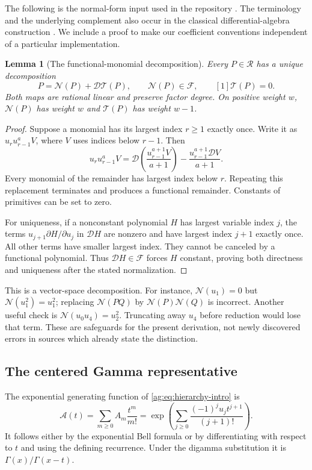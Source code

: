\documentclass[11pt,letterpaper]{article}
\numberwithin{equation}{section}
\newtheorem{lemma}[theorem]{Lemma}
\theoremstyle{definition}\newtheorem{definition}[theorem]{Definition}
\theoremstyle{remark}\newtheorem{remark}[theorem]{Remark}
\newcommand{\D}{\mathcal D}\newcommand{\NF}{\mathcal N}\newcommand{\Prim}{\mathcal T}
\newcommand{\A}{\mathcal A}\newcommand{\HH}{\mathcal H}\newcommand{\BB}{\mathcal B}
\begin{document}
The following is the normal-form input used in the repository
\cite{Manuscript,HTG}. The terminology and the underlying complement
also occur in the classical differential-algebra construction
\cite[Section~4.4.1]{GRR}. We include a proof to make our coefficient
conventions independent of a particular implementation.

\begin{lemma}[The functional-monomial decomposition]\label{ag:lem:normal}
Every $P\in\mathscr R$ has a unique decomposition
\begin{equation}\label{ag:eq:normal-decomp}
 P=\NF(P)+\D\Prim(P),\qquad \NF(P)\in\mathscr F,
                  \qquad [1]\Prim(P)=0.
\end{equation}
Both maps are rational linear and preserve factor degree. On positive
weight $w$, $\NF(P)$ has weight $w$ and $\Prim(P)$ has weight $w-1$.
\end{lemma}
\begin{proof}
Suppose a monomial has its largest index $r\ge1$ exactly once. Write it
as $u_r u_{r-1}^aV$, where $V$ uses indices below $r-1$. Then
\begin{equation}\label{ag:eq:ibp-step}
 u_r u_{r-1}^aV
 =\D\left(\frac{u_{r-1}^{a+1}V}{a+1}\right)
       -\frac{u_{r-1}^{a+1}\D V}{a+1}.
\end{equation}
Every monomial of the remainder has largest index below $r$. Repeating
this replacement terminates and produces a functional remainder.
Constants of primitives can be set to zero.

For uniqueness, if a nonconstant polynomial $H$ has largest variable
index $j$, the terms $u_{j+1}\partial H/\partial u_j$ in $\D H$ are
nonzero and have largest index $j+1$ exactly once. All other terms have
smaller largest index. They cannot be canceled by a functional
polynomial. Thus $\D H\in\mathscr F$ forces $H$ constant, proving
both directness and uniqueness after the stated normalization.
\end{proof}

This is a vector-space decomposition. For instance,
$\NF(u_1)=0$ but $\NF(u_1^2)=u_1^2$; replacing $\NF(PQ)$ by
$\NF(P)\NF(Q)$ is incorrect. Another useful check is
$\NF(u_0u_4)=u_2^2$. Truncating away $u_4$ before reduction would
lose that term. These are safeguards for the present derivation, not
newly discovered errors in sources which already state the distinction.

\subsection{The centered Gamma representative}
The exponential generating function of \eqref{ag:eq:hierarchy-intro} is
\begin{equation}\label{ag:eq:Bell}
 \A(t)=\sum_{m\ge0}A_m\frac{t^m}{m!}
 =\exp\left(\sum_{j\ge0}\frac{(-1)^j u_jt^{j+1}}{(j+1)!}\right).
\end{equation}
It follows either by the exponential Bell formula or by differentiating
with respect to $t$ and using the defining recurrence. Under the digamma
substitution it is $\Gamma(x)/\Gamma(x-t)$.
\end{document}
